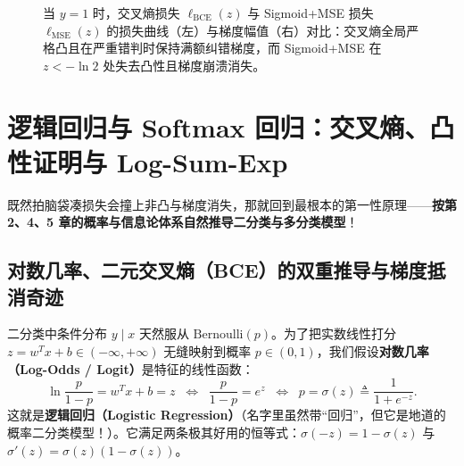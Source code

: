 \begin{figure}[htbp]
\caption{当 $y=1$ 时，交叉熵损失 $\ell_{\text{BCE}}(z)$ 与 Sigmoid+MSE 损失 $\ell_{\text{MSE}}(z)$ 的损失曲线（左）与梯度幅值（右）对比：交叉熵全局严格凸且在严重错判时保持满额纠错梯度，而 Sigmoid+MSE 在 $z < -\ln 2$ 处失去凸性且梯度崩溃消失。}
\label{fig:ch6-mse-vs-bce}
\end{figure}

\section{逻辑回归与 Softmax 回归：交叉熵、凸性证明与 Log-Sum-Exp}
\label{sec:ch6-logreg-softmax}

既然拍脑袋凑损失会撞上非凸与梯度消失，那就回到最根本的第一性原理——\textbf{按第 2、4、5 章的概率与信息论体系自然推导二分类与多分类模型}！

\subsection{对数几率、二元交叉熵（BCE）的双重推导与梯度抵消奇迹}
\label{subsec:ch6-bce}

二分类中条件分布 $y \mid x$ 天然服从 $\mathrm{Bernoulli}(p)$。为了把实数线性打分 $z = w^T x + b \in (-\infty, +\infty)$ 无缝映射到概率 $p \in (0, 1)$，我们假设\textbf{对数几率（Log-Odds / Logit）}是特征的线性函数：
\[
  \ln\frac{p}{1 - p} = w^T x + b = z
  \;\;\Longleftrightarrow\;\;
  \frac{p}{1 - p} = e^z
  \;\;\Longleftrightarrow\;\;
  p = \sigma(z) \triangleq \frac{1}{1 + e^{-z}}.
\]
这就是\textbf{逻辑回归（Logistic Regression）}（名字里虽然带“回归”，但它是地道的概率二分类模型！）。它满足两条极其好用的恒等式：$\sigma(-z) = 1 - \sigma(z)$ 与 $\sigma'(z) = \sigma(z)(1 - \sigma(z))$。

